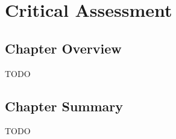 \chapter{Critical Assessment}
\label{chap:assessment}

\section{Chapter Overview}

TODO

\section{Chapter Summary}

TODO
